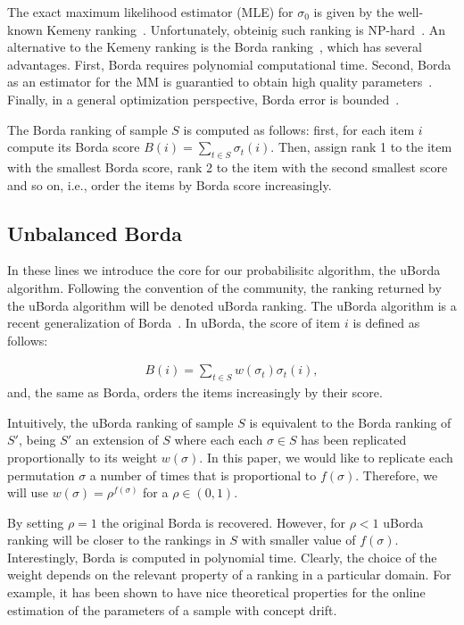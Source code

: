 \documentclass[runningheads]{llncs}
\begin{document}
The exact maximum likelihood estimator (MLE) for $\sigma_0$ is given by the well-known Kemeny ranking~\cite{Dwork:2001:RAM:371920.372165}. Unfortunately,  obteinig such ranking is NP-hard~\cite{Dwork:2001:RAM:371920.372165}. An alternative to the Kemeny ranking is the Borda ranking~\cite{Ali2011}, which has several advantages. First, Borda requires polynomial computational time. Second, Borda as an estimator for the MM is guarantied to obtain high quality parameters~\cite{Caragiannis2013}. Finally, in a general optimization perspective, Borda error is bounded~\cite{Coppersmith:2010}.

The Borda ranking of sample $S$ is computed as follows: first, for each item $i$ compute its Borda score $B(i) =  \sum_{t\in S}  \sigma_t(i)$. Then, assign rank 1 to the item with the smallest Borda score, rank 2 to the item with the second smallest score and so on, i.e., order the items by Borda score increasingly. 

\subsection{Unbalanced Borda}\label{sec:uborda}
In these lines we introduce the core for our probabilisitc algorithm, the uBorda algorithm. Following the convention of the community, the ranking returned by the uBorda algorithm will be denoted uBorda ranking. The uBorda algorithm is a recent generalization of Borda~\cite{}. In uBorda, the score of item $i$ is defined as follows:

\begin{equation}
\begin{split}
B(i) =  \sum_{t\in S}  w(\sigma_t) \sigma_t(i),
\end{split}
\label{eq:uborda_score}
\end{equation}
and, the same as Borda, orders the items increasingly by their score. 

Intuitively, the uBorda ranking of sample $S$ is equivalent to the Borda ranking of $S'$, being $S'$ an extension of $S$ where each each $\sigma\in S$ has been replicated proportionally to its weight $w(\sigma)$. In this paper, we would like to replicate each permutation $\sigma$ a number of times that is proportional to $f(\sigma)$. Therefore, we will use $w(\sigma)=\rho^{f(\sigma)}$ for a $\rho\in(0,1)$. 

By setting $\rho=1$ the original Borda is recovered. However, for $\rho<1$ uBorda ranking will be closer to the rankings in $S$ with smaller value of $f(\sigma)$. Interestingly, Borda is computed in polynomial time. Clearly, the choice of the weight depends on the relevant property of a ranking in a particular domain. For example, it has been shown to have nice theoretical properties for the online estimation of the parameters of a sample with concept drift. 
\end{document}
